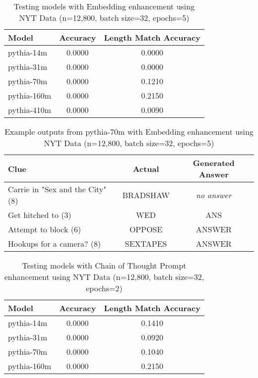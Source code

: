 \documentclass[
	a4paper, %
	10pt, %
	unnumberedsections, %
	twoside, %
]{LTJournalArticle}
\begin{document}
\begin{table*}[h] %
	\centering
	\caption{Testing models with Embedding enhancement using NYT Data (n=12,800, batch size=32, epochs=5)}
	\begin{tabular}{l c c}
		\toprule
		Model & Accuracy & Length Match Accuracy \\
		\midrule
		pythia-14m & 0.0000 & 0.0000 \\
		pythia-31m & 0.0000 & 0.0000 \\
		pythia-70m & 0.0000 & 0.1210 \\
		pythia-160m & 0.0000 & 0.2150 \\
		pythia-410m & 0.0000 & 0.0090\\
		\bottomrule
	\end{tabular}
	\label{tab:embeddingtest}
\end{table*}

\begin{table*}[h] %
	\centering
	\caption{Example outputs from pythia-70m with Embedding enhancement using NYT Data (n=12,800, batch size=32, epochs=5)}
	\begin{tabular}{l c c}
		\toprule
		Clue & Actual & Generated Answer \\
		\midrule
		Carrie in "Sex and the City" (8) & BRADSHAW & \textit{no answer} \\
		Get hitched to (3)& WED & ANS \\
		Attempt to block (6) & OPPOSE & ANSWER \\
		Hookups for a camera? (8) & SEXTAPES & ANSWER \\
		\bottomrule
	\end{tabular}
	\label{tab:embeddingtestexamples}
\end{table*}

\begin{table*}[h] %
	\centering
	\caption{Testing models with Chain of Thought Prompt enhancement using NYT Data (n=12,800, batch size=32, epochs=2)}
	\begin{tabular}{l c c}
		\toprule
		Model & Accuracy & Length Match Accuracy \\
		\midrule
		pythia-14m & 0.0000 & 0.1410 \\
		pythia-31m & 0.0000 & 0.0920 \\
		pythia-70m & 0.0000 & 0.1040 \\
		pythia-160m & 0.0000 & 0.2150 \\
		\bottomrule
	\end{tabular}
	\label{tab:prompttest}
\end{table*}
\end{document}

